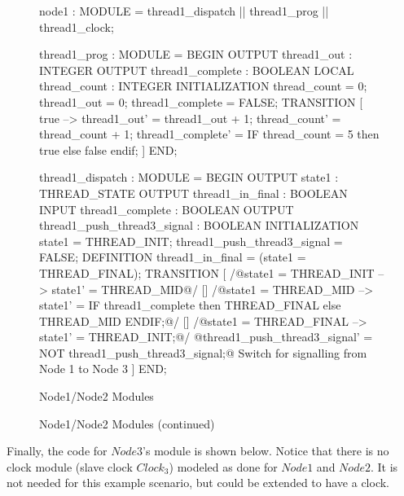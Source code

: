\begin{figure}[ht]
\centering
\begin{sal}[firstnumber=22]
node1 : MODULE = thread1_dispatch || thread1_prog || thread1_clock;

thread1_prog : MODULE = BEGIN OUTPUT thread1_out : INTEGER OUTPUT
thread1_complete : BOOLEAN LOCAL thread_count : INTEGER INITIALIZATION
thread_count = 0; thread1_out = 0; thread1_complete = FALSE; TRANSITION [ true
--> thread1_out' = thread1_out + 1; thread_count' = thread_count + 1;
thread1_complete' = IF thread_count = 5 then true else false endif; ] END;

thread1_dispatch : MODULE = BEGIN OUTPUT state1 : THREAD_STATE OUTPUT
thread1_in_final : BOOLEAN INPUT thread1_complete : BOOLEAN OUTPUT
thread1_push_thread3_signal : BOOLEAN INITIALIZATION state1 = THREAD_INIT;
thread1_push_thread3_signal = FALSE; DEFINITION thread1_in_final = (state1 =
THREAD_FINAL); TRANSITION [ /@state1 = THREAD_INIT --> state1' = THREAD_MID@/ []
/@state1 = THREAD_MID --> state1' = IF thread1_complete then THREAD_FINAL else
THREAD_MID ENDIF;@/ [] /@state1 = THREAD_FINAL --> state1' = THREAD_INIT;@/
@thread1_push_thread3_signal' = NOT thread1_push_thread3_signal;@ %
Switch for signalling from Node 1 to Node 3 ] END;
\end{sal}
\caption{Node1/Node2 Modules}
\label{fig:node1-node2-modules}
\end{figure}

\begin{figure}[ht]
\centering
{}
\caption{Node1/Node2 Modules (continued)}
\label{fig:node1-node2-clock}
\end{figure}

Finally, the code for $Node3$'s module is shown below. Notice that there is no
clock module (slave clock $Clock_3$) modeled as done for $Node1$ and $Node2$. It
is not needed for this example scenario, but could be extended to have a
clock.

